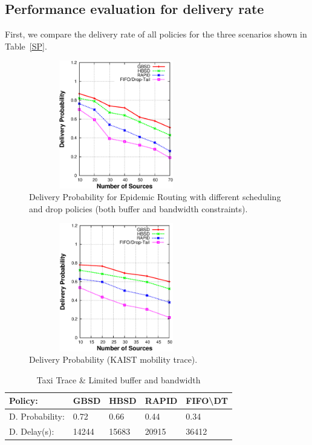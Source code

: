 \subsection{Performance evaluation for delivery rate}
\label{sec:sims:DR}

First, we compare the delivery rate of all policies for the three scenarios shown in Table~\ref{SP}.

\begin{figure}[!h]
\centering
\includegraphics[width=3in,height=2.2in]{Chapitre3/fig2.eps}
\small
\caption{Delivery Probability for Epidemic Routing with different scheduling and drop policies (both buffer and bandwidth constraints).}\normalsize
\label{DR-RWP}
\end{figure}

\begin{figure}[!h]
\centering
\includegraphics[width=3in,height=2.2in]{Chapitre3/fig22.eps}
\small
\caption{Delivery Probability (KAIST mobility trace).}
\normalsize
\label{DR-KAIST}
\end{figure}

\begin{table}[!h]
\renewcommand{\arraystretch}{1.1}
\caption{Taxi Trace \& Limited buffer and bandwidth}
\centering
\footnotesize
\begin{tabular}{|p{2.5cm}||p{0.9cm}||p{0.9cm}||p{0.9cm}||p{1.5cm}|}
\hline
\bfseries Policy: & GBSD & HBSD & RAPID & FIFO\textbackslash DT\\
\hline\hline
D. Probability:&0.72 &0.66 &0.44 &0.34\\
\hline\hline
D. Delay(s):&14244&15683&20915&36412\\
\hline
\end{tabular}
\label{T-LB+LB}
\end{table}

